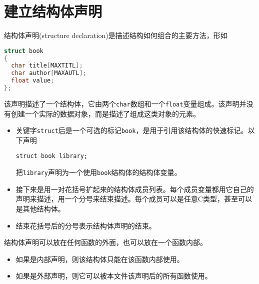 \section{建立结构体声明}
\begin{frame}[fragile]\ft{\secname}
  结构体声明(structure declaration)是描述结构如何组合的主要方法，形如
  \begin{lstlisting}[language=c,backgroundcolor=\color{red!20}]
struct book
{
  char title[MAXTITL];
  char author[MAXAUTL];
  float value;
};    
  \end{lstlisting}
该声明描述了一个结构体，它由两个\verb|char|数组和一个\verb|float|变量组成。该声明并没有创建一个实际的数据对象，而是描述了组成这类对象的元素。  
\end{frame}

\begin{frame}[fragile]\ft{\secname}
  \begin{itemize}
  \item 关键字\verb|struct|后是一个可选的标记\verb|book|，是用于引用该结构体的快速标记。以下声明
  \begin{lstlisting}[basicstyle=\ttfamily]
struct book library;
  \end{lstlisting}
把\verb|library|声明为一个使用\verb|book|结构体的结构体变量。 \\[0.1in]
\item 接下来是用一对花括号扩起来的结构体成员列表。每个成员变量都用它自己的声明来描述，用一个分号来结束描述。每个成员可以是任意C类型，甚至可以是其他结构体。 \\[0.1in]
\item 结束花括号后的分号表示结构体声明的结束。
  \end{itemize}
\end{frame}

\begin{frame}[fragile]\ft{\secname}
  结构体声明可以放在任何函数的外面，也可以放在一个函数内部。\vspace{.1in}

  \begin{itemize}
  \item 
    如果是内部声明，则该结构体只能在该函数内部使用。\\[0.1in]
  \item
    如果是外部声明，则它可以被本文件该声明后的所有函数使用。
  \end{itemize}
\end{frame}

